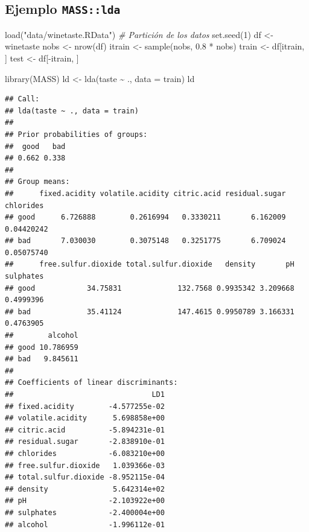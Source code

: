 \documentclass[
  spanish,
]{book}
\newenvironment{Shaded}{\begin{snugshade}}{\end{snugshade}}
\newcommand{\AttributeTok}[1]{\textcolor[rgb]{0.77,0.63,0.00}{#1}}
\newcommand{\CommentTok}[1]{\textcolor[rgb]{0.56,0.35,0.01}{\textit{#1}}}
\newcommand{\DecValTok}[1]{\textcolor[rgb]{0.00,0.00,0.81}{#1}}
\newcommand{\FloatTok}[1]{\textcolor[rgb]{0.00,0.00,0.81}{#1}}
\newcommand{\FunctionTok}[1]{\textcolor[rgb]{0.00,0.00,0.00}{#1}}
\newcommand{\NormalTok}[1]{#1}
\newcommand{\OtherTok}[1]{\textcolor[rgb]{0.56,0.35,0.01}{#1}}
\newcommand{\SpecialCharTok}[1]{\textcolor[rgb]{0.00,0.00,0.00}{#1}}
\newcommand{\StringTok}[1]{\textcolor[rgb]{0.31,0.60,0.02}{#1}}
\theoremstyle{break}
\theoremstyle{definition}
\theoremstyle{definition}
\theoremstyle{definition}
\theoremstyle{definition}
\theoremstyle{remark}
\begin{document}
\hypertarget{ejemplo-masslda}{%
\subsection{\texorpdfstring{Ejemplo \texttt{MASS::lda}}{Ejemplo MASS::lda}}\label{ejemplo-masslda}}

\begin{Shaded}
\begin{Highlighting}[]
\FunctionTok{load}\NormalTok{(}\StringTok{"data/winetaste.RData"}\NormalTok{)}
\CommentTok{\# Partición de los datos}
\FunctionTok{set.seed}\NormalTok{(}\DecValTok{1}\NormalTok{)}
\NormalTok{df }\OtherTok{\textless{}{-}}\NormalTok{ winetaste}
\NormalTok{nobs }\OtherTok{\textless{}{-}} \FunctionTok{nrow}\NormalTok{(df)}
\NormalTok{itrain }\OtherTok{\textless{}{-}} \FunctionTok{sample}\NormalTok{(nobs, }\FloatTok{0.8} \SpecialCharTok{*}\NormalTok{ nobs)}
\NormalTok{train }\OtherTok{\textless{}{-}}\NormalTok{ df[itrain, ]}
\NormalTok{test }\OtherTok{\textless{}{-}}\NormalTok{ df[}\SpecialCharTok{{-}}\NormalTok{itrain, ]}

\FunctionTok{library}\NormalTok{(MASS)}
\NormalTok{ld }\OtherTok{\textless{}{-}} \FunctionTok{lda}\NormalTok{(taste }\SpecialCharTok{\textasciitilde{}}\NormalTok{ ., }\AttributeTok{data =}\NormalTok{ train)}
\NormalTok{ld}
\end{Highlighting}
\end{Shaded}

\begin{verbatim}
## Call:
## lda(taste ~ ., data = train)
## 
## Prior probabilities of groups:
##  good   bad 
## 0.662 0.338 
## 
## Group means:
##      fixed.acidity volatile.acidity citric.acid residual.sugar  chlorides
## good      6.726888        0.2616994   0.3330211       6.162009 0.04420242
## bad       7.030030        0.3075148   0.3251775       6.709024 0.05075740
##      free.sulfur.dioxide total.sulfur.dioxide   density       pH sulphates
## good            34.75831             132.7568 0.9935342 3.209668 0.4999396
## bad             35.41124             147.4615 0.9950789 3.166331 0.4763905
##        alcohol
## good 10.786959
## bad   9.845611
## 
## Coefficients of linear discriminants:
##                                LD1
## fixed.acidity        -4.577255e-02
## volatile.acidity      5.698858e+00
## citric.acid          -5.894231e-01
## residual.sugar       -2.838910e-01
## chlorides            -6.083210e+00
## free.sulfur.dioxide   1.039366e-03
## total.sulfur.dioxide -8.952115e-04
## density               5.642314e+02
## pH                   -2.103922e+00
## sulphates            -2.400004e+00
## alcohol              -1.996112e-01
\end{verbatim}
\end{document}
